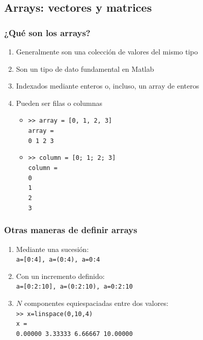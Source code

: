 \subsection{Arrays: vectores y matrices}
\begin{frame}[label=arrays]
 \frametitle{¿Qué son los arrays?}
 \begin{enumerate}
  \item Generalmente son una colección de valores del mismo tipo
  \item Son un tipo de dato fundamental en Matlab
  \item Indexados mediante enteros o, incluso, un array de enteros
  \item Pueden ser filas o columnas
   \begin{itemize}
    \item \texttt{>> array = [0, 1, 2, 3]\\array = \\ \hspace*{0.5cm} 0 1 2 3}
    \item \texttt{>> column = [0; 1; 2; 3]\\column = \\ \hspace*{0.5cm} 0
        \\\hspace*{0.5cm} 1 \\\hspace*{0.5cm} 2 \\\hspace*{0.5cm} 3}
  \end{itemize}
\end{enumerate}
\end{frame}
\begin{frame}[label=arrays2]
 \frametitle{Otras maneras de definir arrays}
 \begin{enumerate}
  \item Mediante una sucesión: \\\texttt{a=[0:4], a=(0:4), a=0:4}
  \item Con un incremento definido: \\\texttt{a=[0:2:10], a=(0:2:10), a=0:2:10}
  \item $N$ componentes equiespaciadas entre dos valores:
    \\\texttt{>> x=linspace(0,10,4) \\x = \\ \hspace*{0.5cm} 0.00000
\hspace*{0.25cm} 3.33333 \hspace*{0.25cm} 6.66667 \hspace*{0.25cm} 10.00000}
\end{enumerate}
\end{frame}
